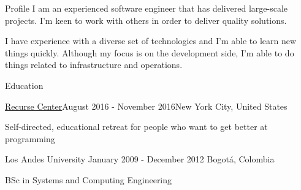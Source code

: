 \documentclass{resume} %
\def\uniandes{Los Andes University }
\begin{document}
\begin{rSection}{Profile}
I am an experienced software engineer that has delivered large-scale projects. I'm keen to work with others in order to deliver quality solutions. 

I have experience with a diverse set of technologies and I'm able to learn new things quickly. Although my focus is on the development side, I'm able to do things related to infrastructure and operations.
\end{rSection}



\begin{rSection}{Education}

\begin{rSubsection}{\href{https://www.recurse.com/about}{Recurse Center}}{August 2016 - November 2016}{New York City, United States}
\item Self-directed, educational retreat for people who want to get better at programming
\end{rSubsection}

\begin{rSubsection}{\uniandes}{January 2009 - December 2012} {Bogot\'a, Colombia}
\item BSc in Systems and Computing Engineering  
\end{rSubsection}

\end{rSection}

\end{document}
